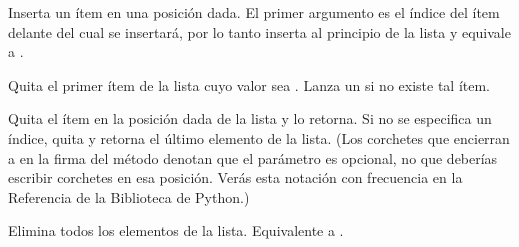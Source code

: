 \documentclass[a5paper,10pt,spanish]{sphinxmanual}
\begin{document}
\begin{fulllineitems}
\sphinxAtStartPar
Inserta un ítem en una posición dada. El primer argumento es el índice del ítem delante del cual se insertará, por lo tanto  inserta al principio de la lista y  equivale a .

\end{fulllineitems}



\begin{fulllineitems}
\sphinxAtStartPar
Quita el primer ítem de la lista cuyo valor sea . Lanza un  si no existe tal ítem.

\end{fulllineitems}



\begin{fulllineitems}
\sphinxAtStartPar
Quita el ítem en la posición dada de la lista y lo retorna. Si no se especifica un índice,  quita y retorna el último elemento de la lista. (Los corchetes que encierran a  en la firma del método denotan que el parámetro es opcional, no que deberías escribir corchetes en esa posición. Verás esta notación con frecuencia en la Referencia de la Biblioteca de Python.)

\end{fulllineitems}



\begin{fulllineitems}
\sphinxAtStartPar
Elimina todos los elementos de la lista. Equivalente a .

\end{fulllineitems}
\end{document}
